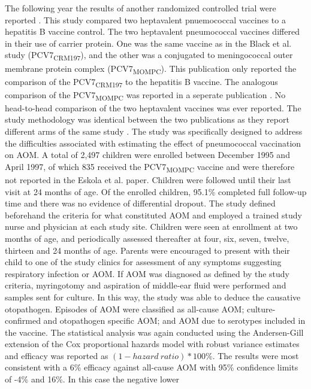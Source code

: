\documentclass[]{book}
\theoremstyle{definition}
\theoremstyle{definition}
\theoremstyle{definition}
\theoremstyle{remark}
\begin{document}
The following year the results of another randomized controlled trial
were reported \citep{Eskola2001}. This study compared two heptavalent
pnuemococcal vaccines to a hepatitis B vaccine control. The two
heptavalent pneumococcal vaccines differed in their use of carrier
protein. One was the same vaccine as in the Black et al. study
(PCV7\textsubscript{CRM197}), and the other was a conjugated to
meningococcal outer membrane protein complex
(PCV7\textsubscript{MOMPC}). This publication only reported the
comparison of the PCV7\textsubscript{CRM197} to the hepatitis B vaccine.
The analogous comparison of the PCV7\textsubscript{MOMPC} was reported
in a seperate publication \citep{Kilpi2003}. No head-to-head comparison
of the two heptavalent vaccines was ever reported. The study methodology
was identical between the two publications as they report different arms
of the same study \citep{Eskola2001, Kilpi2003}. The study was
specifically designed to address the difficulties associated with
estimating the effect of pneumococcal vaccination on AOM. A total of
2,497 children were enrolled between December 1995 and April 1997, of
which 835 received the PCV7\textsubscript{MOMPC} vaccine and were
therefore not reported in the Eskola et al. paper. Children were
followed until their last visit at 24 months of age. Of the enrolled
children, 95.1\% completed full follow-up time and there was no evidence
of differential dropout. The study defined beforehand the criteria for
what constituted AOM and employed a trained study nurse and physician at
each study site. Children were seen at enrollment at two months of age,
and periodically assessed thereafter at four, six, seven, twelve,
thirteen and 24 months of age. Parents were encouraged to present with
their child to one of the study clinics for assessment of any symptoms
suggesting respiratory infection or AOM. If AOM was diagnosed as defined
by the study criteria, myringotomy and aspiration of middle-ear fluid
were performed and samples sent for culture. In this way, the study was
able to deduce the causative otopathogen. Episodes of AOM were
classified as all-cause AOM; culture-confirmed and otopathogen specific
AOM; and AOM due to serotypes included in the vaccine. The statistical
analysis was again conducted using the Andersen-Gill extension of the
Cox proportional hazards model with robust variance estimates and
efficacy was reported as \((1 - hazard\ ratio) *100\%\). The results
were most consistent with a 6\% efficacy against all-cause AOM with 95\%
confidence limits of -4\% and 16\%. In this case the negative lower
\end{document}
